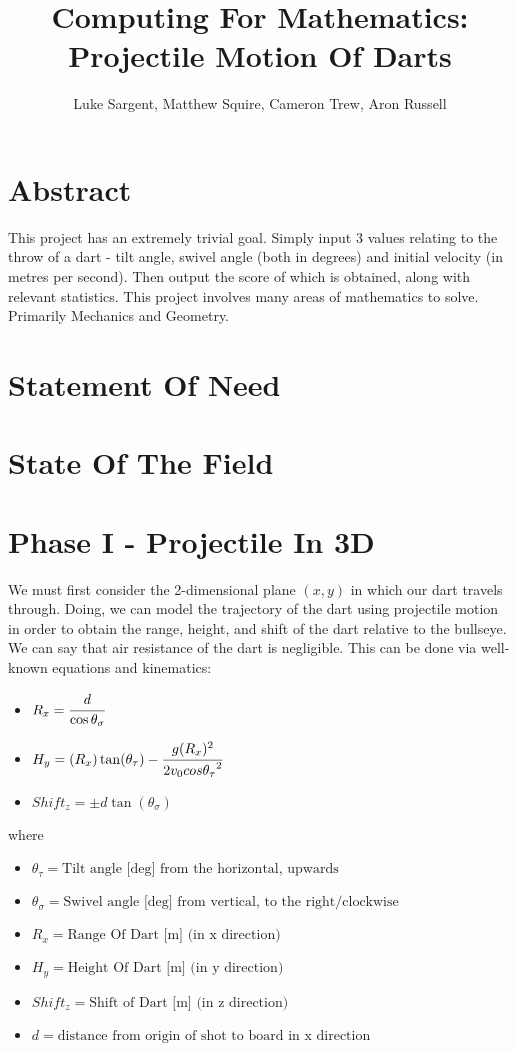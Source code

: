 \documentclass[a4paper]{article}
\title{Computing For Mathematics: Projectile Motion Of Darts}
\author{Luke Sargent, Matthew Squire, Cameron Trew, Aron Russell}
\begin{document}
\maketitle

\section{Abstract}
This project has an extremely trivial goal. Simply input 3 values relating to the throw of a dart
- tilt angle, swivel angle (both in degrees) and initial velocity (in metres per second). Then output the score of which is obtained, along with
relevant statistics. This project involves many areas of mathematics to solve.
Primarily Mechanics and Geometry.

\section{Statement Of Need}

\section{State Of The Field}

\section{Phase I - Projectile In 3D}
We must first consider the 2-dimensional plane $(x,y)$ in which our dart
travels through. Doing, we can model the trajectory of the dart using projectile motion
in order to obtain the range, height, and shift of the dart relative to the bullseye. We can say that air resistance of the dart is negligible. This can be done via well-known equations and kinematics: 

\begin{itemize}\label{Projectile Equations}
    \item \(R_x  = \cfrac{d}{\cos \theta_\sigma}\)
    \item \(H_y  = (R_x)\tan(\theta_\tau) - \cfrac{g(R_x)^2}{2v_0cos{\theta_\tau}^2}\)
    \item \(Shift_z  = \pm d \tan(\theta_\sigma) \)
\end{itemize}

where

\begin{itemize}\label{Glossary Of Terms}
    \item \(\theta_\tau = \text{Tilt angle [deg] from the horizontal, upwards}\)
    \item \(\theta_\sigma = \text{Swivel angle [deg] from vertical, to the right/clockwise}\)
    \item \(R_x = \text{Range Of Dart [m] (in x direction)}\)
    \item \(H_y = \text{Height Of Dart [m] (in y direction)}\)
    \item \(Shift_z = \text{Shift of Dart [m] (in z direction)}\)
    \item \( d = \text{distance from origin of shot to board in x direction}\)
\end{itemize}
\end{document}
